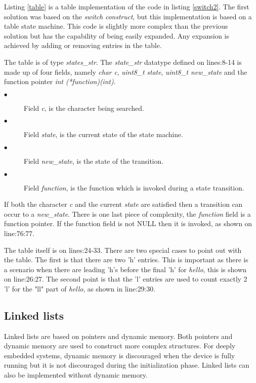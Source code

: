 Listing \ref{table} is a table implementation of the code in listing \ref{switch2}. The first solution was based on the \textit{switch construct}, but this implementation is based on a table state machine. This code is slightly more complex than the previous solution but has the capability of being easily expanded. Any expansion is achieved by adding or removing entries in the table.

The table is of type \textit{states\_str}. The \textit{state\_str} datatype defined on lines:8-14 is made up of four fields, namely \textit{char c}, \textit{uint8\_t state}, \textit{uint8\_t new\_state} and the function pointer \textit{int (*function)(int)}. 

\begin{description}
 \item[$\bullet$] Field \textit{c}, is the character being searched.
 \item[$\bullet$] Field \textit{state}, is the current state of the state machine.
 \item[$\bullet$] Field \textit{new\_state}, is the state of the transition.
 \item[$\bullet$] Field \textit{function}, is the function which is invoked during a state transition.
\end{description}

If both the character \textit{c} and the current \textit{state} are satisfied then a transition can occur to a \textit{new\_state}. There is one last piece of complexity, the \textit{function} field is a function pointer. If the function field is not NULL then it is invoked, as shown on line:76:77.

The table itself is on lines:24-33. There are two special cases to point out with the table. The first is that there are two 'h' entries. This is important as there is a scenario when there are leading 'h's before the final 'h' for \textit{hello}, this is shown on line:26:27. The second point is that the 'l' entries are used to count exactly 2 'l' for the "ll" part of \textit{hello}, as shown in line:29:30.

\subsection{Linked lists}

Linked lists are based on pointers and dynamic memory. Both pointers and dynamic memory are used to construct more complex structures. For deeply embedded systems, dynamic memory is discouraged when the device is fully running but it is not discouraged during the initialization phase. Linked lists can also be implemented without dynamic memory.

